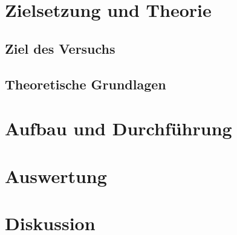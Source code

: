 





\maketitle
\tableofcontents
\newpage

\section{Zielsetzung und Theorie}

\subsection{Ziel des Versuchs}


\subsection{Theoretische Grundlagen}


\section{Aufbau und Durchführung}


% 

\section{Auswertung}


\section{Diskussion}


\newpage
\nocite{*}
\printbibliography


